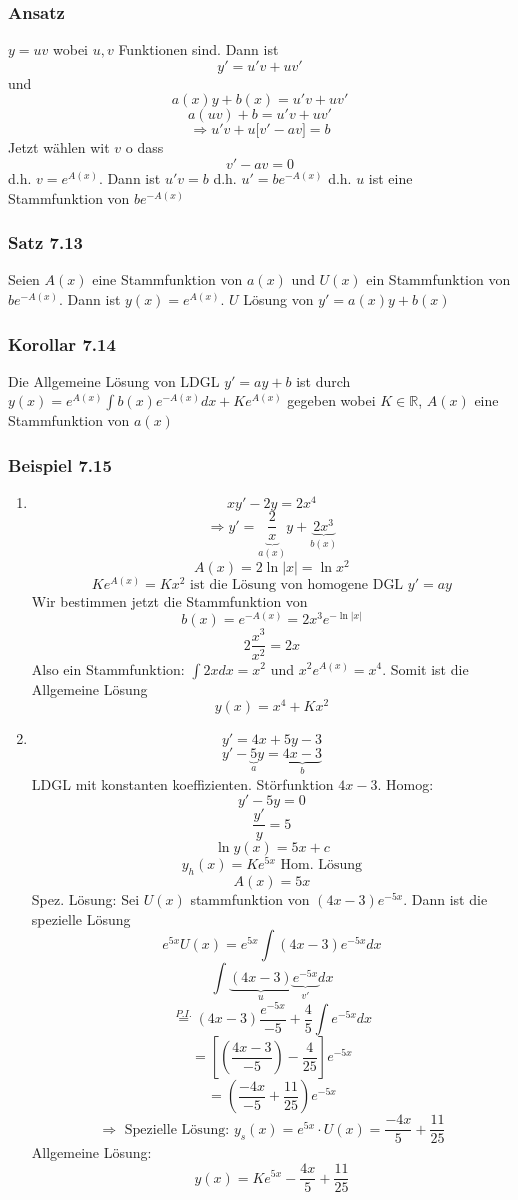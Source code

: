 \subsubsection*{Ansatz}
$y=uv$ wobei $u,v$ Funktionen sind. Dann ist $$y'=u'v+uv'$$ und $$a(x)y+b(x)=u'v+uv'$$$$a(uv)+b=u'v+uv'$$$$\Rightarrow u'v+u\lbrack v'-av\rbrack =b$$
Jetzt wählen wit $v$ o dass $$v'-av=0$$ d.h. $v=e^{A(x)}$. Dann ist $u'v=b$ d.h. $u'=be^{-A(x)}$ d.h. $u$ ist eine Stammfunktion von $be^{-A(x)}$

\subsubsection*{Satz 7.13}
Seien $A(x)$ eine Stammfunktion von $a(x)$ und $U(x)$ ein Stammfunktion von $be^{-A(x)}$. Dann ist $y(x)=e^{A(x)}$. $U$ Lösung von $y'=a(x)y+b(x)$

\subsubsection*{Korollar 7.14}
Die Allgemeine Lösung von LDGL $y'=ay+b$ ist durch $y(x)=e^{A(x)}\int{b(x)e^{-A(x)} dx}+Ke^{A(x)}$ gegeben wobei $K\in\mathbb{R}$, $A(x)$ eine Stammfunktion von $a(x)$

\subsubsection*{Beispiel 7.15}
\begin{enumerate}
\item $$xy'-2y=2x^4$$
$$\Rightarrow y' = \underbrace {\frac{2}{x}}_{a(x)}y + \underbrace {2{x^3}}_{b(x)}$$
$$A(x)=2\ln\left| x \right|=\ln x^2$$
$$Ke^{A(x)}=Kx^2\text{ ist die Lösung von homogene DGL }y'=ay$$
Wir bestimmen jetzt die Stammfunktion von $$b(x)=e^{-A(x)}=2x^3e^{-\ln \left| x\right|}$$
$$2\frac{x^3}{x^2}=2x$$
Also ein Stammfunktion: $\int{2xdx=x^2}$ und $x^2e^{A(x)}=x^4$. Somit ist die Allgemeine Lösung $$y(x)=x^4+Kx^2$$
\item $$y'=4x+5y-3$$
\[y' - \underbrace 5_ay = \underbrace {4x - 3}_b\]
LDGL mit konstanten koeffizienten. Störfunktion $4x-3$. Homog: $$y'-5y=0$$
$$\frac{y'}{y}=5$$
$$\ln y(x)=5x+c$$
$$y_h(x)=Ke^{5x} \text{ Hom. Lösung}$$
$$A(x)=5x$$
Spez. Lösung: Sei $U(x)$ stammfunktion von $(4x-3)e^{-5x}$. Dann ist die spezielle Lösung $$e^{5x}U(x)=e^{5x}\int{(4x-3)e^{-5x}dx}$$
$$ \int {\underbrace {(4x - 3)}_u\underbrace {{e^{ - 5x}}}_{v'}dx} $$
$$\mathop = \limits^{P.I.} (4x - 3)\frac{{{e^{ - 5x}}}}{{ - 5}} + \frac{4}{5}\int {{e^{ - 5x}}dx}$$
$$ = \left[ {\left( {\frac{{4x - 3}}{{ - 5}}} \right) - \frac{4}{{25}}} \right]{e^{ - 5x}}$$
$$ = \left( {\frac{{ - 4x}}{{ - 5}} + \frac{{11}}{{25}}} \right){e^{ - 5x}}$$
$$\Rightarrow \text{ Spezielle Lösung: }y_s(x)=e^{5x}\cdot U(x)=\frac{-4x}{5}+\frac{11}{25}$$
Allgemeine Lösung: $$y(x)=Ke^{5x}-\frac{4x}{5}+\frac{11}{25}$$
\end{enumerate}

